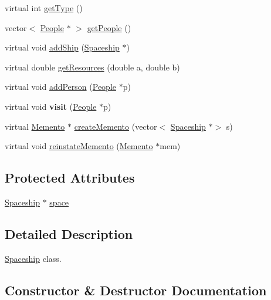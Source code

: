 \begin{DoxyCompactItemize}
virtual int \hyperlink{classSpaceship_a113055e6d793f8fbc55e44efc4d57e07}{get\+Type} ()
\item 
vector$<$ \hyperlink{classPeople}{People} $\ast$ $>$ \hyperlink{classSpaceship_a23155ea96d499b31bde27e0c2f704ae6}{get\+People} ()
\item 
virtual void \hyperlink{classSpaceship_a90e1321cdbcb459b98b75ab39cef867d}{add\+Ship} (\hyperlink{classSpaceship}{Spaceship} $\ast$)
\item 
virtual double \hyperlink{classSpaceship_ad2027533de1d789db5e3efa22055f2d0}{get\+Resources} (double a, double b)
\item 
virtual void \hyperlink{classSpaceship_add8d9c6dfd5f6ecb8399e41e71e5b22f}{add\+Person} (\hyperlink{classPeople}{People} $\ast$p)
\item 
\mbox{\label{classSpaceship_a0738743f89a841847605c3262a822183}} 
virtual void {\bfseries visit} (\hyperlink{classPeople}{People} $\ast$p)
\item 
virtual \hyperlink{classMemento}{Memento} $\ast$ \hyperlink{classSpaceship_a6d272f846b019dec8226ddab65648a7b}{create\+Memento} (vector$<$ \hyperlink{classSpaceship}{Spaceship} $\ast$$>$ s)
\item 
virtual void \hyperlink{classSpaceship_ab075c869473344b6471c8e28ca7ea61e}{reinstate\+Memento} (\hyperlink{classMemento}{Memento} $\ast$mem)
\end{DoxyCompactItemize}
\subsection*{Protected Attributes}
\begin{DoxyCompactItemize}
\item 
\hyperlink{classSpaceship}{Spaceship} $\ast$ \hyperlink{classSpaceship_a0f53795d5f23cc37369cea2e52bd70b1}{space}
\end{DoxyCompactItemize}


\subsection{Detailed Description}
\hyperlink{classSpaceship}{Spaceship} class. 

\subsection{Constructor \& Destructor Documentation}
\mbox{\label{classSpaceship_a13f1c8eb5ded2fb1687203322b22bca9}} 

